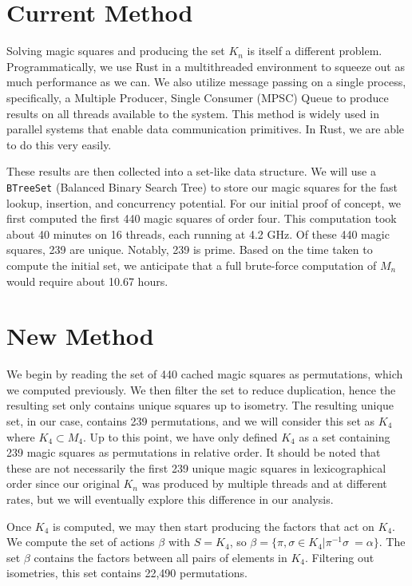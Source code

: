 \documentclass[12pt]{report}
\begin{document}
\section{Current Method}

\par Solving magic squares and producing the set $K_n$ is itself a different problem.
Programmatically, we use Rust in a multithreaded environment to squeeze out as much performance as
we can. We also utilize message passing on a single process, specifically, a Multiple Producer,
Single Consumer (MPSC) Queue to produce results on all threads available to the system. This method
is widely used in parallel systems that enable data communication primitives. In Rust, we are able
to do this very easily.

\par These results are then collected into a set-like data structure. We will use a
\texttt{BTreeSet} (Balanced Binary Search Tree) to store our magic squares for the fast lookup,
insertion, and concurrency potential. For our initial proof of concept, we first computed the first
440 magic squares of order four. This computation took about 40 minutes on 16 threads, each running
at 4.2 GHz. Of these 440 magic squares, 239 are unique. Notably, 239 is prime. Based on the time
taken to compute the initial set, we anticipate that a full brute-force computation of $M_n$ would
require about 10.67 hours.

\section{New Method}

\par We begin by reading the set of 440 cached magic squares as permutations, which we computed
previously. We then filter the set to reduce duplication, hence the resulting set only contains
unique squares up to isometry. The resulting unique set, in our case, contains 239 permutations,
and we will consider this set as $K_4$ where $K_4\subset M_4$. Up to this point, we have only
defined $K_4$ as a set containing 239 magic squares as permutations in relative order. It should be
noted that these are not necessarily the first 239 unique magic squares in lexicographical order
since our original $K_n$ was produced by multiple threads and at different rates, but we will
eventually explore this difference in our analysis.

\par Once $K_4$ is computed, we may then start producing the factors that act on $K_4$. We compute
the set of actions $\beta$ with $S = K_4$, so  $\beta = \{\pi,\sigma\in K_4| \pi^{-1}\sigma\ =
  \alpha\}$. The set $\beta$ contains the factors between all pairs of elements in $K_4$. Filtering
out isometries, this set contains 22,490 permutations.
\end{document}
